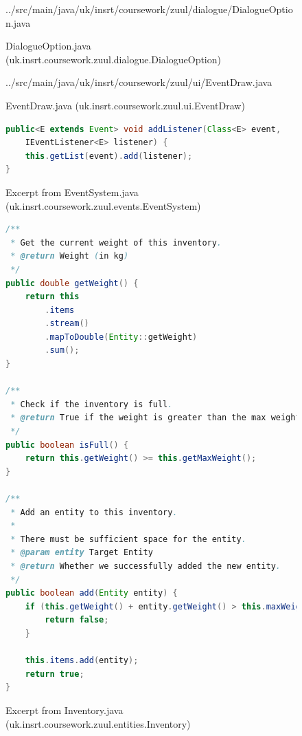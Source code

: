 \documentclass{article}
\begin{document}
    \begin{figure}
        
        {../src/main/java/uk/insrt/coursework/zuul/dialogue/DialogueOption.java}
        \caption{DialogueOption.java (uk.insrt.coursework.zuul.dialogue.DialogueOption)} \label{fig:dialogue}
    \end{figure}
    \begin{figure}
        
        {../src/main/java/uk/insrt/coursework/zuul/ui/EventDraw.java}
        \caption{EventDraw.java (uk.insrt.coursework.zuul.ui.EventDraw)} \label{fig:event-draw}
    \end{figure}
    \begin{figure}
        \begin{lstlisting}[language=Java]
public<E extends Event> void addListener(Class<E> event,
    IEventListener<E> listener) {
    this.getList(event).add(listener);
}\end{lstlisting}
        \caption{Excerpt from EventSystem.java (uk.insrt.coursework.zuul.events.EventSystem)} \label{fig:generic-method}
    \end{figure}
    \begin{figure}
        \begin{lstlisting}[language=Java]
/**
 * Get the current weight of this inventory.
 * @return Weight (in kg)
 */
public double getWeight() {
    return this
        .items
        .stream()
        .mapToDouble(Entity::getWeight)
        .sum();
}

/**
 * Check if the inventory is full.
 * @return True if the weight is greater than the max weight
 */
public boolean isFull() {
    return this.getWeight() >= this.getMaxWeight();
}

/**
 * Add an entity to this inventory.
 * 
 * There must be sufficient space for the entity.
 * @param entity Target Entity
 * @return Whether we successfully added the new entity.
 */
public boolean add(Entity entity) {
    if (this.getWeight() + entity.getWeight() > this.maxWeight) {
        return false;
    }

    this.items.add(entity);
    return true;
}\end{lstlisting}
        \caption{Excerpt from Inventory.java (uk.insrt.coursework.zuul.entities.Inventory)} \label{fig:inventory}
    \end{figure}
\end{document}
